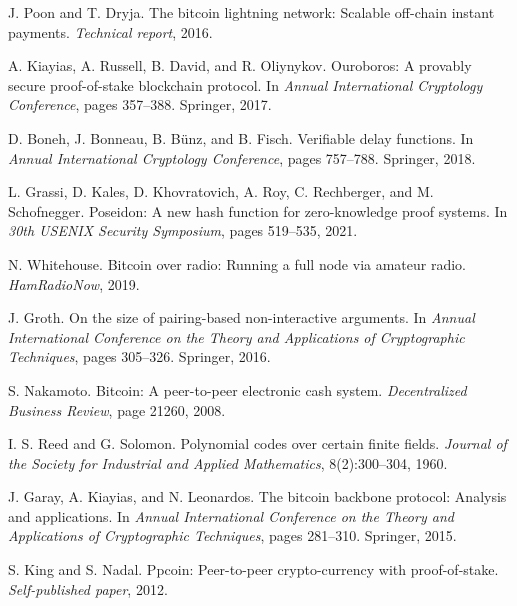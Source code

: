 \documentclass[11pt,a4paper]{article}
\begin{document}
\begin{thebibliography}{99}

J. Poon and T. Dryja.
\newblock The bitcoin lightning network: Scalable off-chain instant payments.
\newblock \emph{Technical report}, 2016.

A. Kiayias, A. Russell, B. David, and R. Oliynykov.
\newblock Ouroboros: A provably secure proof-of-stake blockchain protocol.
\newblock In \emph{Annual International Cryptology Conference}, pages 357--388. Springer, 2017.

D. Boneh, J. Bonneau, B. Bünz, and B. Fisch.
\newblock Verifiable delay functions.
\newblock In \emph{Annual International Cryptology Conference}, pages 757--788. Springer, 2018.

L. Grassi, D. Kales, D. Khovratovich, A. Roy, C. Rechberger, and M. Schofnegger.
\newblock Poseidon: A new hash function for zero-knowledge proof systems.
\newblock In \emph{30th USENIX Security Symposium}, pages 519--535, 2021.

N. Whitehouse.
\newblock Bitcoin over radio: Running a full node via amateur radio.
\newblock \emph{HamRadioNow}, 2019.

J. Groth.
\newblock On the size of pairing-based non-interactive arguments.
\newblock In \emph{Annual International Conference on the Theory and Applications of Cryptographic Techniques}, pages 305--326. Springer, 2016.

S. Nakamoto.
\newblock Bitcoin: A peer-to-peer electronic cash system.
\newblock \emph{Decentralized Business Review}, page 21260, 2008.

I. S. Reed and G. Solomon.
\newblock Polynomial codes over certain finite fields.
\newblock \emph{Journal of the Society for Industrial and Applied Mathematics}, 8(2):300--304, 1960.

J. Garay, A. Kiayias, and N. Leonardos.
\newblock The bitcoin backbone protocol: Analysis and applications.
\newblock In \emph{Annual International Conference on the Theory and Applications of Cryptographic Techniques}, pages 281--310. Springer, 2015.

S. King and S. Nadal.
\newblock Ppcoin: Peer-to-peer crypto-currency with proof-of-stake.
\newblock \emph{Self-published paper}, 2012.


\end{thebibliography}
\end{document}
